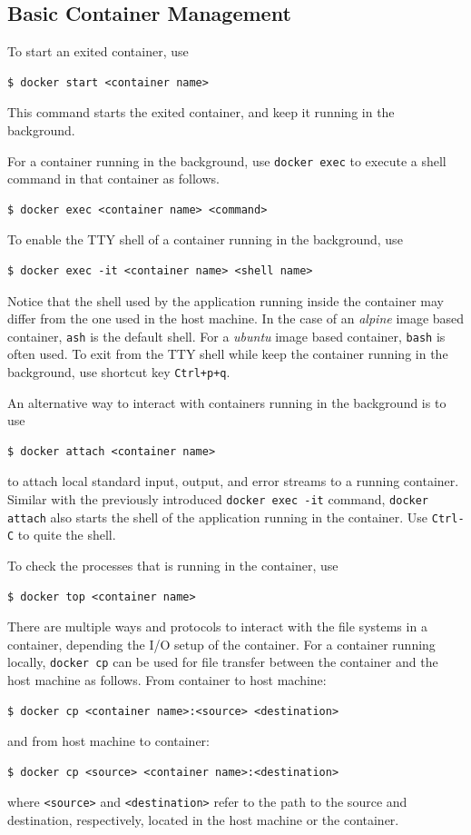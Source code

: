 \subsection{Basic Container Management}

To start an exited container, use
\begin{lstlisting}
$ docker start <container name>
\end{lstlisting}
This command starts the exited container, and keep it running in the background.

For a container running in the background, use \verb|docker exec| to execute a shell command in that container as follows.
\begin{lstlisting}
$ docker exec <container name> <command>
\end{lstlisting}

To enable the TTY shell of a container running in the background, use
\begin{lstlisting}
$ docker exec -it <container name> <shell name>
\end{lstlisting}
Notice that the shell used by the application running inside the container may differ from the one used in the host machine. In the case of an \textit{alpine} image based container, \verb|ash| is the default shell. For a \textit{ubuntu} image based container, \verb|bash| is often used. To exit from the TTY shell while keep the container running in the background, use shortcut key \verb|Ctrl+p+q|.

An alternative way to interact with containers running in the background is to use
\begin{lstlisting}
$ docker attach <container name>
\end{lstlisting}
to attach local standard input, output, and error streams to a running container. Similar with the previously introduced \texttt{docker exec -it} command, \texttt{docker attach} also starts the shell of the application running in the container. Use \verb|Ctrl-C| to quite the shell.

To check the processes that is running in the container, use
\begin{lstlisting}
$ docker top <container name>
\end{lstlisting}

There are multiple ways and protocols to interact with the file systems in a container, depending the I/O setup of the container. For a container running locally, \verb|docker cp| can be used for file transfer between the container and the host machine as follows. From container to host machine:
\begin{lstlisting}
$ docker cp <container name>:<source> <destination>
\end{lstlisting}
and from host machine to container:
\begin{lstlisting}
$ docker cp <source> <container name>:<destination>
\end{lstlisting}
where \verb|<source>| and \verb|<destination>| refer to the path to the source and destination, respectively, located in the host machine or the container.

